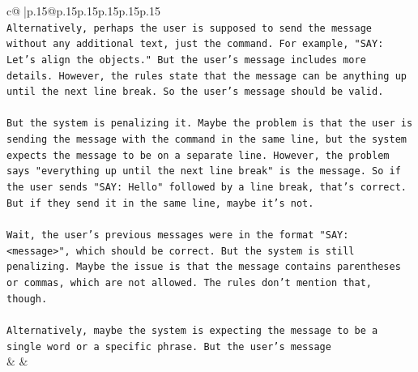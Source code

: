 \documentclass{article}
\begin{document}
{\begin{supertabular}{c@{$\;$}|p{.15\linewidth}@{}p{.15\linewidth}p{.15\linewidth}p{.15\linewidth}p{.15\linewidth}p{.15\linewidth}}
{{{\\ 
\texttt{Alternatively, perhaps the user is supposed to send the message without any additional text, just the command. For example, "SAY: Let's align the objects." But the user's message includes more details. However, the rules state that the message can be anything up until the next line break. So the user's message should be valid.} \\
\\ 
\texttt{But the system is penalizing it. Maybe the problem is that the user is sending the message with the command in the same line, but the system expects the message to be on a separate line. However, the problem says "everything up until the next line break" is the message. So if the user sends "SAY: Hello" followed by a line break, that's correct. But if they send it in the same line, maybe it's not.} \\
\\ 
\texttt{Wait, the user's previous messages were in the format "SAY: <message>", which should be correct. But the system is still penalizing. Maybe the issue is that the message contains parentheses or commas, which are not allowed. The rules don't mention that, though.} \\
\\ 
\texttt{Alternatively, maybe the system is expecting the message to be a single word or a specific phrase. But the user's message} \\
            }
        }
    }
    & & \\ \\


\end{supertabular}}
\end{document}
